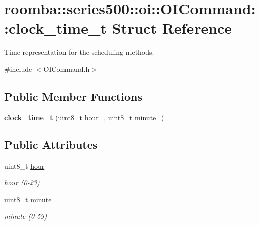 \hypertarget{structroomba_1_1series500_1_1oi_1_1_o_i_command_1_1clock__time__t}{\section{roomba\+:\+:series500\+:\+:oi\+:\+:O\+I\+Command\+:\+:clock\+\_\+time\+\_\+t Struct Reference}
\label{structroomba_1_1series500_1_1oi_1_1_o_i_command_1_1clock__time__t}
}


Time representation for the scheduling methods.  




{\ttfamily \#include $<$O\+I\+Command.\+h$>$}

\subsection*{Public Member Functions}
\begin{DoxyCompactItemize}
\item 
\hypertarget{structroomba_1_1series500_1_1oi_1_1_o_i_command_1_1clock__time__t_a39d8a1a26377d7210c67854df4b19b50}{{\bfseries clock\+\_\+time\+\_\+t} (uint8\+\_\+t hour\+\_, uint8\+\_\+t minute\+\_)}\label{structroomba_1_1series500_1_1oi_1_1_o_i_command_1_1clock__time__t_a39d8a1a26377d7210c67854df4b19b50}

\end{DoxyCompactItemize}
\subsection*{Public Attributes}
\begin{DoxyCompactItemize}
\item 
\hypertarget{structroomba_1_1series500_1_1oi_1_1_o_i_command_1_1clock__time__t_a0af194f4641422dd061629f93a6c2a1b}{uint8\+\_\+t \hyperlink{structroomba_1_1series500_1_1oi_1_1_o_i_command_1_1clock__time__t_a0af194f4641422dd061629f93a6c2a1b}{hour}}\label{structroomba_1_1series500_1_1oi_1_1_o_i_command_1_1clock__time__t_a0af194f4641422dd061629f93a6c2a1b}

\begin{DoxyCompactList}\small\item\em hour (0-\/23) \end{DoxyCompactList}\item 
\hypertarget{structroomba_1_1series500_1_1oi_1_1_o_i_command_1_1clock__time__t_acc6379ae46c433585814912c2c0d266d}{uint8\+\_\+t \hyperlink{structroomba_1_1series500_1_1oi_1_1_o_i_command_1_1clock__time__t_acc6379ae46c433585814912c2c0d266d}{minute}}\label{structroomba_1_1series500_1_1oi_1_1_o_i_command_1_1clock__time__t_acc6379ae46c433585814912c2c0d266d}

\begin{DoxyCompactList}\small\item\em minute (0-\/59) \end{DoxyCompactList}\end{DoxyCompactItemize}


